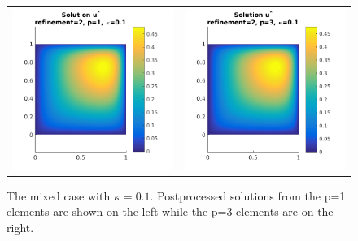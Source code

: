 \documentclass{article}
\begin{document}
\begin{figure}[!ht]
\begin{tabular}{c c}
\includegraphics[scale=0.7]{umustar_132.png} &
\includegraphics[scale=0.7]{umustar_232.png}
\end{tabular}
\caption{The mixed case with $\kappa = 0.1$. Postprocessed solutions from the p=1 elements are shown on the left while the p=3 elements are on the right.}
\label{fig:ustar100}
\end{figure}
\end{document}
